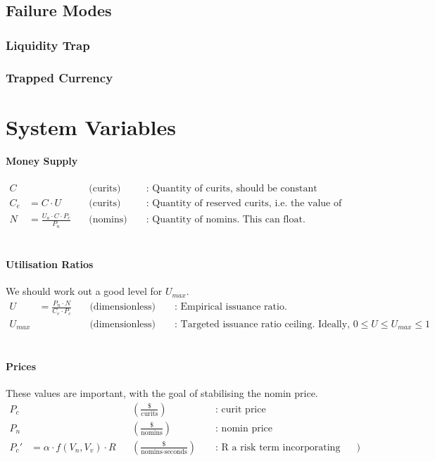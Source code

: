 \documentclass{article}
\begin{document}
\subsection{Failure Modes}
\subsubsection{Liquidity Trap}
\subsubsection{Trapped Currency}

\pagebreak
\section{System Variables}
\hfill

\paragraph{Money Supply}
\begin{align*}
    C & \ && \text{(curits)} && \text{ : Quantity of curits, should be constant} \\
    C_e &= C \cdot U \ && \text{(curits)} && \text{ : Quantity of reserved curits, i.e. the value of tokens have been issued against } \\
    N &= \frac{U_a \cdot C \cdot P_c}{P_n} \ && \text{(nomins)} && \text{ : Quantity of nomins. This can float.}
\end{align*}
\\

\paragraph{Utilisation Ratios} We should work out a good level for \(U_{max}\).
\begin{align*}
    U &= \frac{P_n \cdot N}{C_e \cdot P_c} \ && \text{(dimensionless)} && \text{ : Empirical issuance ratio. } \\
    U_{max} & \ && \text{(dimensionless)} && \text{ : Targeted issuance ratio ceiling. Ideally, } 0 \leq U \leq U_{max} \leq 1
\end{align*}
\\

\paragraph{Prices} These values are important, with the goal of stabilising the nomin price.
\begin{align*}
    P_c & \ && (\frac{\text{\$}}{\text{curits}}) && \text{ : curit price} \\
    P_n & \ && (\frac{\text{\$}}{\text{nomins}}) && \text{ : nomin price} \\
    P_c' &= \alpha \cdot f(V_n, V_v) \cdot R && (\frac{\text{\$}}{\text{nomins} \cdot \text{seconds}}) && \text{ : R a risk term incorporating volatility? \#buyers - \#sellers?})
\end{align*}
\\
\end{document}
